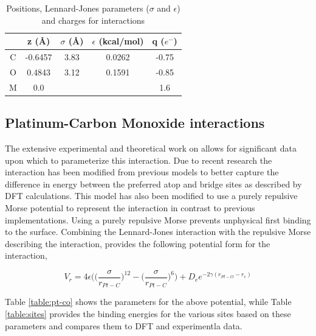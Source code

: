 \begin{table}[ht]
\caption{Positions, Lennard-Jones parameters ($\sigma$ and $\epsilon$) and charges for  interactions}
\centering
\begin{tabular}{c c c c c}
\hline\hline
 & z (\AA) & $\sigma$ (\AA) & $\epsilon$ (kcal/mol) & q ($e^{-}$) \\
 \hline
 C & -0.6457 & 3.83 & 0.0262 & -0.75 \\
 O & 0.4843 & 3.12 & 0.1591 & -0.85 \\
 M & 0.0 & & & 1.6 \\
 \hline
 \end{tabular}
\label{tab:parameters}
\end{table}

\subsection{Platinum-Carbon Monoxide interactions}
The extensive experimental \citep{Yeo:1997th, Ertl:1977cg, Kelemen:1979ad,
?,?,?} and theoretical \citep{Deshlahra:2012aa, Korzeniewski:1986kl,
Beurden:2002ys, Deshlahra:2009wu, Feibelman:2001qa, Mason:2004ix} work on
 allows for significant data upon which to parameterize this
interaction.  Due to recent research the  interaction has been
modified from previous models\citep{Michalka:2013aa, Michalka:2015aa} to better
capture the difference in energy between the preferred atop and bridge
sites as described by DFT calculations.\citep{Deshlahra:2012aa} This model has
also been modified to use a purely repulsive Morse potential to represent the
 interaction in contrast to previous
implementations.\citep{Korzeniewski:1986kl, Michalka:2013aa} Using a purely
repulsive Morse prevents unphysical  first binding to the surface.
Combining the Lennard-Jones  interaction with the repulsive
Morse describing the  interaction, provides the following
potential form for the  interaction,

\begin{equation}
V_{r} = 4\epsilon\bigg(\Big(\frac{\sigma}{r_{Pt-C}}\Big)^{12} - \Big(\frac{\sigma}{r_{Pt-C}}\Big)^{6}\bigg) + D_{e}e^{-2\gamma(r_{Pt-O}-r_{e})}
\end{equation}

Table \ref{table:pt-co} shows the parameters for the above potential, while
Table \ref{table:sites} provides the binding energies for the various sites
based on these parameters and compares them to DFT\citep{Deshlahra:2012aa} and
experimentla data.\citep{}

